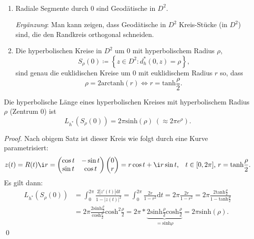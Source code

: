 \begin{deduction}
  \
  \begin{enumerate}
    \item Radiale Segmente durch \( 0 \) sind Geodätische in \( D^2 \).

    \emph{Ergänzung}: Man kann zeigen, dass Geodätische in \( D^2 \) Kreis-Stücke (in \( D^2 \)) sind, die den Randkreis orthogonal schneiden.

    \item Die hyperbolischen Kreise in \( D^2 \) um \( 0 \) mit hyperbolischem Radius \( \rho \),
    \begin{equation*}
      S_\rho(0) \coloneqq \left \{ z \in D^2 : d_h^\ast(0,z) = \rho \right \}\text{,}
    \end{equation*}
    sind genau die euklidischen Kreise um \( 0 \) mit euklidischem Radius \( r \) so, dass
    \begin{equation*}
      \rho = 2 \text{arctanh}(r) \Leftrightarrow r = \text{tanh}\frac{\rho}{2}\text{.}
    \end{equation*}
  \end{enumerate}
\end{deduction}

\begin{remark}[Anwendung]
  Die hyperbolische Länge eines hyperbolischen Kreises mit hyperbolischem Radius \( \rho \) (Zentrum \( 0 \)) ist
  \begin{equation*}
    L_{h^\ast}(S_\rho(0)) = 2\pi\text{sinh}(\rho) \ (\approx 2\pi e^\rho)\text{.}
  \end{equation*}

  \begin{proof}
    Nach obigem Satz ist dieser Kreis wie folgt durch eine Kurve parametrisiert:
    \begin{equation*}
      z(t) = R(t) \i r = \begin{pmatrix}
        \cos t & -\sin t \\
        \sin t & \cos t
      \end{pmatrix}\begin{pmatrix}
        0 \\ r
      \end{pmatrix} = r\cos t + \i r \sin t\text{,}\quad t \in [0,2\pi]\text{,} \ r = \text{tanh}\frac{\rho}{2}\text{.}
    \end{equation*}
    Es gilt dann:
    \begin{align*}
      L_{h^\ast}(S_\rho(0)) &= \int_0^{2\pi} \frac{2\left\vert z'(t) \right\vert\text{d}t}{1-\left\vert z(t) \right\vert^2} = \int_0^{2\pi}\frac{2r}{1-r^2}\text{d}t = 2\pi \frac{2r}{1-r^2} = 2\pi \frac{2 \text{tanh}\frac{\rho}{2}}{1-\text{tanh}\frac{\rho}{2}} \\
      &= 2\pi \frac{2\text{sinh}\frac{\rho}{2}}{\text{cosh}\frac{\rho}{2}}\text{cosh}^2\frac{\rho}{2} = 2\pi * \underbrace{2\text{sinh}\frac{\rho}{2}\text{cosh}\frac{\rho}{2}}_{= \text{sinh}\rho} = 2\pi \text{sinh}(\rho)\text{.}
    \end{align*} \qed{}
  \end{proof}
\end{remark}

